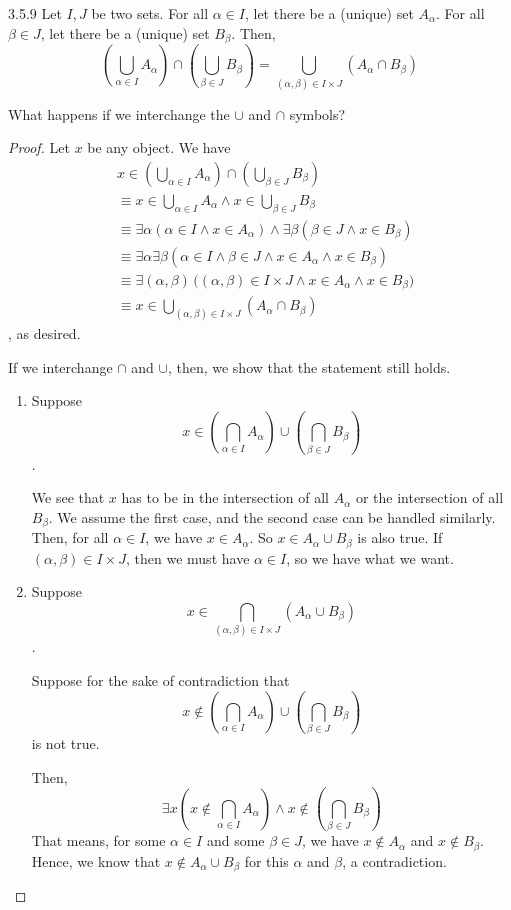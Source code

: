 \begin{exercise}{3.5.9}
	Let $I,J$ be two sets. For all $\alpha \in I$, let there be a (unique) set $A_\alpha$. For all $\beta \in J$, let there be a (unique) set $B_\beta$. Then,
	\[
		(\bigcup_{\alpha \in I}A_\alpha) \cap (\bigcup_{\beta \in J}B_\beta) = 
		\bigcup_{(\alpha,\beta) \in I \times J}(A_\alpha \cap B_\beta)
	\]
	
	What happens if we interchange the $\cup$ and $\cap$ symbols?
\end{exercise}
\begin{proof}
	Let $x$ be any object. We have
	\begin{align*}
		&x \in (\bigcup_{\alpha \in I}A_\alpha) \cap (\bigcup_{\beta \in J}B_\beta) \\
		&\equiv x \in \bigcup_{\alpha \in I}A_\alpha \wedge x \in \bigcup_{\beta \in J}B_\beta \\
		&\equiv \exists \alpha(\alpha \in I \wedge x \in A_\alpha) \wedge \exists \beta(\beta \in J \wedge x \in B_\beta) \\
		&\equiv \exists\alpha\exists\beta(\alpha \in I \wedge \beta \in J \wedge x \in A_\alpha \wedge x \in B_\beta) \\
		&\equiv \exists(\alpha,\beta)\,\bigl((\alpha,\beta) \in I \times J \wedge x \in A_\alpha \wedge  x \in B_\beta\bigr) \\
		&\equiv x \in \bigcup_{(\alpha,\beta) \in I \times J}(A_\alpha \cap B_\beta)
	\end{align*}
	, as desired. \hfill \qedsymbol
	
	If we interchange $\cap$ and $\cup$, then, we show that the statement still holds.
	
	\begin{enumerate}
		\item
		Suppose \[x \in (\bigcap_{\alpha \in I}A_\alpha) \cup (\bigcap_{\beta \in J}B_\beta)\].
		
		We see that $x$ has to be in the intersection of all $A_\alpha$ or the intersection of all $B_\beta$. We assume the first case, and the second case can be handled similarly. Then, for all $\alpha \in I$, we have $x \in A_\alpha$. So $x \in A_\alpha \cup B_\beta$ is also true. If $(\alpha, \beta) \in I \times J$, then we must have $\alpha \in I$, so we have what we want.
		
		\item Suppose \[x \in \bigcap_{(\alpha,\beta) \in I \times J}(A_\alpha \cup B_\beta)\].
		
		Suppose for the sake of contradiction that 
		\[x \notin (\bigcap_{\alpha \in I}A_\alpha) \cup (\bigcap_{\beta \in J}B_\beta)\]
		is not true.
		
		Then,
		\[
			\exists x(x \notin \bigcap_{\alpha \in I}A_\alpha) \wedge x \notin (\bigcap_{\beta \in J}B_\beta)
		\]
		That means, for some $\alpha \in I$ and some $\beta \in J$, we have $x \notin A_\alpha$ and $x \notin B_\beta$. Hence, we know that $x \notin A_\alpha \cup B_\beta$ for this $\alpha$ and $\beta$, a contradiction.
	\end{enumerate}
\end{proof}

